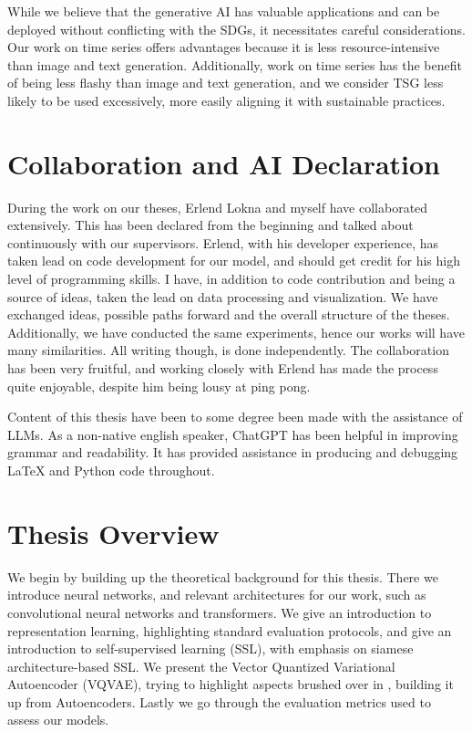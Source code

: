 \documentclass[../../thesis.tex]{subfiles}
\begin{document}
While we believe that the generative AI has valuable applications and can be deployed without conflicting with the SDGs, it necessitates careful considerations. Our work on time series offers advantages because it is less resource-intensive than image and text generation. Additionally, work on time series has the benefit of being less flashy than image and text generation, and we consider TSG less likely to be used excessively, more easily aligning it with sustainable practices.

\section{Collaboration and AI Declaration}

During the work on our theses, Erlend Lokna and myself have collaborated extensively. This has been declared from the beginning and talked about continuously with our supervisors. Erlend, with his developer experience, has taken lead on code development for our model, and should get credit for his high level of programming skills. I have, in addition to code contribution and being a source of ideas, taken the lead on data processing and visualization. We have exchanged ideas, possible paths forward and the overall structure of the theses. Additionally, we have conducted the same experiments, hence our works will have many similarities. All writing though, is done independently. The collaboration has been very fruitful, and working closely with Erlend has made the process quite enjoyable, despite him being lousy at ping pong. \newline

Content of this thesis have been to some degree been made with the assistance of LLMs. As a non-native english speaker, ChatGPT has been helpful in improving grammar and readability. It has provided assistance in producing and debugging LaTeX and Python code throughout.

\section{Thesis Overview}
We begin by building up the theoretical background for this thesis. There we introduce neural networks, and relevant architectures for our work, such as convolutional neural networks and transformers. We give an introduction to representation learning, highlighting standard evaluation protocols, and give an introduction to self-supervised learning (SSL), with emphasis on siamese architecture-based SSL. We present the Vector Quantized Variational Autoencoder (VQVAE), trying to highlight aspects brushed over in \cite{VQVAE}, building it up from Autoencoders. Lastly we go through the evaluation metrics used to assess our models. \newline
\end{document}
